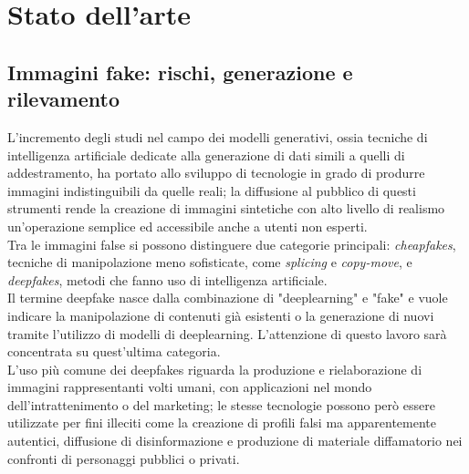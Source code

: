 \chapter{Stato dell'arte}\label{ch:theory}
\section{Immagini fake: rischi, generazione e rilevamento}\label{sec:fakeimg}
L'incremento degli studi nel campo dei modelli generativi, ossia tecniche di intelligenza artificiale dedicate alla generazione di dati simili a quelli di addestramento, ha portato allo sviluppo di tecnologie in grado di produrre immagini indistinguibili da quelle reali; la diffusione al pubblico di questi strumenti rende la creazione di immagini sintetiche con alto livello di realismo un'operazione semplice ed accessibile anche a utenti non esperti.\\ 
Tra le immagini false si possono distinguere due categorie principali: \textit{cheapfakes}, tecniche di manipolazione meno sofisticate, come \textit{splicing} e \textit{copy-move}, e  \textit{deepfakes}, metodi che fanno uso di intelligenza artificiale.\\Il termine deepfake nasce dalla combinazione di "deeplearning" e "fake" e vuole indicare la manipolazione di contenuti già esistenti o la generazione di nuovi tramite l'utilizzo di modelli di deeplearning. L'attenzione di questo lavoro sarà concentrata su quest'ultima categoria.\\
L'uso più comune dei deepfakes riguarda la produzione e rielaborazione di immagini rappresentanti volti umani, con applicazioni nel mondo dell'intrattenimento o del marketing; le stesse tecnologie possono però essere utilizzate per fini illeciti come la creazione di profili falsi ma apparentemente autentici, diffusione di disinformazione e produzione di materiale diffamatorio nei confronti di personaggi pubblici o privati.
